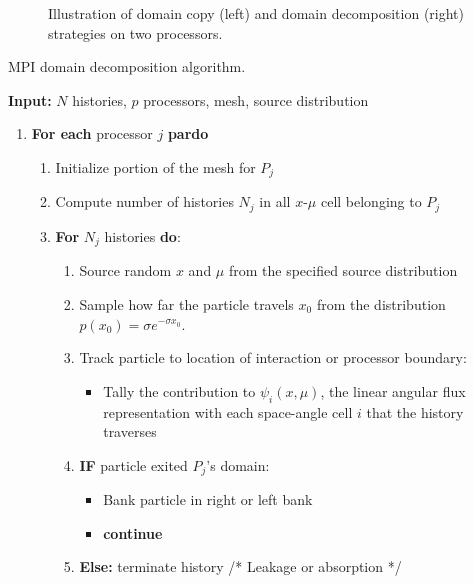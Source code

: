 \documentclass[12pt]{article}
\begin{document}
{{\begin{figure}[hb!]
    \centering
    \def\svgwidth{0.9\textwidth}
    
    \caption{Illustration of domain copy (left) and domain decomposition (right)
        strategies on two processors. \label{hawt}}
    \end{figure}
\begin{algorithm}
    \caption{MPI domain decomposition algorithm.\label{alg:dec}}
    \vspace{0.06in}
    \textbf{Input:} $N$ histories, $p$ processors, mesh, source distribution
    \vspace{-0.1in}
    \begin{enumerate}
    \item \textbf{For each} processor $j$ \textbf{pardo}
    \begin{enumerate} 
    \item Initialize portion of the mesh for $P_j$
    \item Compute number of histories $N_j$ in all $x$-$\mu$ cell belonging to $P_j$
    \item \textbf{For} {$N_j$ histories} \textbf{do}:
        \begin{enumerate}
       \item Source random $x$ and $\mu$ from the specified source distribution
       \item \label{itm:start} Sample how far the particle travels $x_0$ from the distribution $p(x_0) =
        \sigma e^{-\sigma x_0}$.
    \item Track particle to location of interaction or processor boundary:
        \begin{itemize}
            \item Tally the contribution to $\psi_i(x,\mu)$, the
                linear angular flux representation with each space-angle cell $i$
                that the history traverses
        \end{itemize}
    \item \textbf{IF} particle exited $P_j$'s domain:
        \begin{itemize}
            \item Bank particle in right or left bank
            \item \textbf{continue}
        \end{itemize}
    \item \textbf{Else:} \label{itm:end} terminate history /* Leakage or absorption */
\end{enumerate}
\end{enumerate}

\end{enumerate}
\end{algorithm}}}
\end{document}
